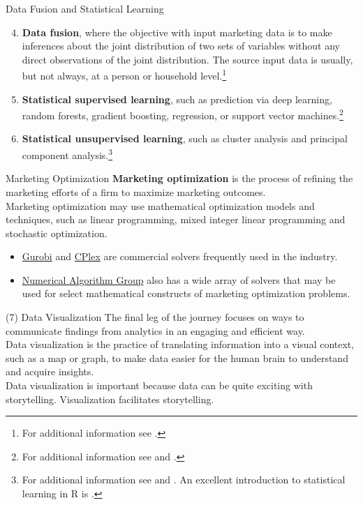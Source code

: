 \documentclass[pdf]{beamer}
\newcommand{\empr}[1]{{\color{franklinblue}\textbf{#1}}}
\theoremstyle{remark}
\theoremstyle{definition}
\begin{document}
\begin{frame}[t]{Data Fusion and Statistical Learning}
\small
\begin{enumerate}
  \setcounter{enumi}{3}
  \item \empr{Data fusion}, where the objective with input marketing data is to make inferences about the joint distribution of two sets of variables without any direct observations of the joint distribution.  The source input data is usually, but not always, at a person or household level.\footnote{For additional information see \cite{vanderPutten2010}.}
  \item \empr{Statistical supervised learning}, such as prediction via deep learning, random forests, gradient boosting, regression, or support vector machines.\footnote{For additional information see  \cite{hastie2009} and \cite{efron2020}.}  
  \item \empr{Statistical unsupervised learning}, such as cluster analysis and principal component analysis.\footnote{For additional information see \cite{hastie2009} and \cite{everitt2011}. An excellent introduction to statistical learning in R is \cite{james2021}.}
\end{enumerate}

\end{frame}

\begin{frame}[t]{Marketing Optimization}
\empr{Marketing optimization} is the process of refining the marketing efforts of a firm to maximize marketing outcomes. \\
\vspace{1.5ex}
Marketing optimization may use mathematical optimization models and techniques, such as linear programming, mixed integer linear programming and stochastic optimization.   
\begin{itemize}
\item \href{https://www.gurobi.com/}{Gurobi} and \href{https://www.ibm.com/products/ilog-cplex-optimization-studio/cplex-optimizer}{CPlex} are commercial solvers frequently used in the industry.  
\item \href{https://www.nag.com/}{Numerical Algorithm Group} also has a wide array of solvers that may be used for select mathematical constructs of marketing optimization problems.
\end{itemize}
\end{frame}


\begin{frame}[t]{(7) Data Visualization}
The final leg of the journey focuses on ways to communicate findings from analytics in an engaging and efficient way. \\
\vspace{1.5ex} 
Data visualization is the practice of translating information into a visual context, such as a map or graph, to make data easier for the human brain to understand and acquire insights. \\
\vspace{1.5ex}
Data visualization is important because data can be quite exciting with storytelling. Visualization facilitates storytelling.\\
\vspace{1.5ex}
\end{frame}
\end{document}
